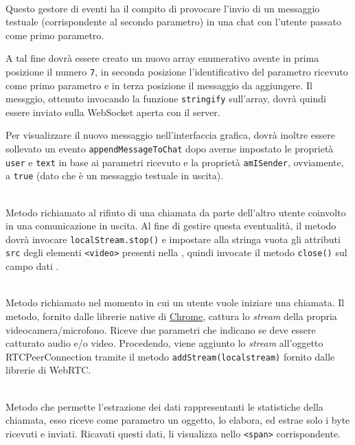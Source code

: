 \begin{description}
  \item{}\\
  Questo gestore di eventi ha il compito di provocare l'invio di un messaggio testuale (corrispondente al secondo parametro) in una chat con l'utente passato come primo parametro.
  
  A tal fine dovrà essere creato un nuovo array enumerativo avente in prima posizione il numero \verb'7', in seconda posizione l'identificativo del parametro ricevuto come primo parametro e in terza posizione il messaggio da aggiungere. Il messggio, ottenuto invocando la funzione \verb'stringify' sull'array, dovrà quindi essere inviato sulla WebSocket aperta con il server.
  
  Per visualizzare il nuovo messaggio nell'interfaccia grafica, dovrà inoltre essere sollevato un evento \verb'appendMessageToChat' dopo averne impostato le proprietà \verb'user' e \verb'text' in base ai parametri ricevuto e la proprietà \verb'amISender', ovviamente, a \verb'true' (dato che è un messaggio testuale in uscita).
  
  \item{}\\
  Metodo richiamato al rifiuto di una chiamata da parte dell'altro utente coinvolto in una comunicazione in uscita. Al fine di gestire questa eventualità, il metodo dovrà invocare \verb'localStream.stop()' e impostare alla stringa vuota gli attributi \verb'src' degli elementi \verb'<video>' presenti nella , quindi invocate il metodo \verb'close()' sul campo dati .

  \item{}\\
  Metodo richiamato nel momento in cui un utente vuole iniziare una chiamata. Il metodo, fornito dalle librerie native di \underline{Chrome}, cattura lo \textit{stream} della propria videocamera/microfono. Riceve due parametri che indicano se deve essere catturato audio e/o video. Procedendo, viene aggiunto lo \textit{stream} all'oggetto RTCPeerConnection tramite il metodo \verb'addStream(localstream)' fornito dalle librerie di WebRTC\@.

  \item{}\\
  Metodo che permette l'estrazione dei dati rappresentanti le statistiche della chiamata, esso riceve come parametro un oggetto, lo elabora, ed estrae solo i byte ricevuti e inviati. Ricavati questi dati, li visualizza nello \verb'<span>' corrispondente.


\end{description}
